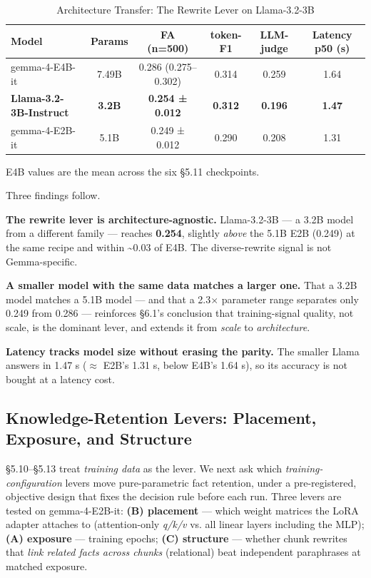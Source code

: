 \documentclass[10pt,twocolumn]{article}
\begin{document}
\begin{table}[htbp]
  \centering\small
  \caption{Architecture Transfer: The Rewrite Lever on Llama-3.2-3B}
  \label{tab:architecture-transfer-the-rewrite-lever-on-llama-3-2-3b}
  \begin{tabularx}{\textwidth}{Lccccc}
  \toprule
    Model & Params & FA (n=500) & token-F1 & LLM-judge & Latency p50 (s) \\
  \midrule
  \midrule
  gemma-4-E4B-it & 7.49B & 0.286 (0.275--0.302) & 0.314 & 0.259 & 1.64 \\
  \textbf{Llama-3.2-3B-Instruct} & \textbf{3.2B} & \textbf{0.254 ± 0.012} & \textbf{0.312} & \textbf{0.196} & \textbf{1.47} \\
  gemma-4-E2B-it & 5.1B & 0.249 ± 0.012 & 0.290 & 0.208 & 1.31 \\
  \bottomrule
  \end{tabularx}
\end{table}


E4B values are the mean across the six \S{}5.11 checkpoints.


Three findings follow.


\textbf{The rewrite lever is architecture-agnostic.} Llama-3.2-3B --- a 3.2B model from a different family --- reaches \textbf{0.254}, slightly \textit{above} the 5.1B E2B (0.249) at the same recipe and within \textasciitilde{}0.03 of E4B. The diverse-rewrite signal is not Gemma-specific.


\textbf{A smaller model with the same data matches a larger one.} That a 3.2B model matches a 5.1B model --- and that a 2.3$\times$ parameter range separates only 0.249 from 0.286 --- reinforces \S{}6.1's conclusion that training-signal quality, not scale, is the dominant lever, and extends it from \textit{scale} to \textit{architecture}.


\textbf{Latency tracks model size without erasing the parity.} The smaller Llama answers in 1.47 s ($\approx$ E2B's 1.31 s, below E4B's 1.64 s), so its accuracy is not bought at a latency cost.


\subsection{Knowledge-Retention Levers: Placement, Exposure, and Structure}

\S{}5.10--\S{}5.13 treat \textit{training data} as the lever. We next ask which \textit{training-configuration} levers move pure-parametric fact retention, under a pre-registered, objective design that fixes the decision rule before each run. Three levers are tested on gemma-4-E2B-it: \textbf{(B) placement} --- which weight matrices the LoRA adapter attaches to (attention-only \textit{q/k/v} vs. all linear layers including the MLP); \textbf{(A) exposure} --- training epochs; \textbf{(C) structure} --- whether chunk rewrites that \textit{link related facts across chunks} (relational) beat independent paraphrases at matched exposure.
\end{document}
